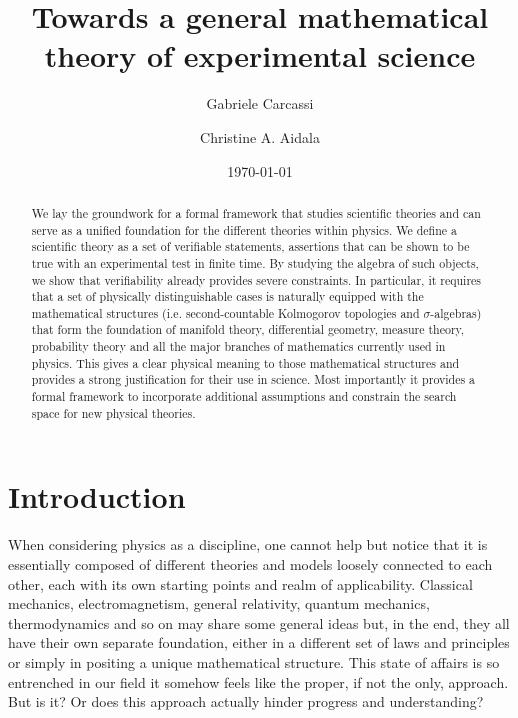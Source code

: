 \documentclass[%
reprint,
amsmath,amssymb,
aps,
prx,
]{revtex4-1}
\theoremstyle{plain}%
\theoremstyle{definition}
\theoremstyle{remark}
\begin{document}
\title{Towards a general mathematical theory of experimental science}


\author{Gabriele Carcassi}
\author{Christine A. Aidala}

\date{\today}

\begin{abstract}
	We lay the groundwork for a formal framework that studies scientific theories and can serve as a unified foundation for the different theories within physics. We define a scientific theory as a set of verifiable statements, assertions that can be shown to be true with an experimental test in finite time. By studying the algebra of such objects, we show that verifiability already provides severe constraints. In particular, it requires that a set of physically distinguishable cases is naturally equipped with the mathematical structures (i.e. second-countable Kolmogorov topologies and $\sigma$-algebras) that form the foundation of manifold theory, differential geometry, measure theory, probability theory and all the major branches of mathematics currently used in physics. This gives a clear physical meaning to those mathematical structures and provides a strong justification for their use in science. Most importantly it provides a formal framework to incorporate additional assumptions and constrain the search space for new physical theories.
\end{abstract}

\maketitle


\section{Introduction}

When considering physics as a discipline, one cannot help but notice that it is essentially composed of different theories and models loosely connected to each other, each with its own starting points and realm of applicability. Classical mechanics, electromagnetism, general relativity, quantum mechanics, thermodynamics and so on may share some general ideas but, in the end, they all have their own separate foundation, either in a different set of laws and principles or simply in positing a unique mathematical structure. This state of affairs is so entrenched in our field it somehow feels like the proper, if not the only, approach. But is it? Or does this approach actually hinder progress and understanding?
\end{document}
